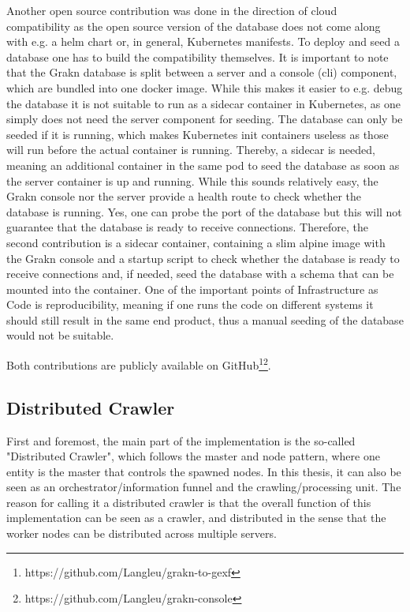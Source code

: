 Another open source contribution was done in the direction of cloud compatibility as the open source version of the database does not come along with e.g. a helm chart or, in general, Kubernetes manifests. To deploy and seed a database one has to build the compatibility themselves. It is important to note that the Grakn database is split between a server and a console (cli) component, which are bundled into one docker image. While this makes it easier to e.g. debug the database it is not suitable to run as a sidecar container in Kubernetes, as one simply does not need the server component for seeding. The database can only be seeded if it is running, which makes Kubernetes init containers useless as those will run before the actual container is running. Thereby, a sidecar is needed, meaning an additional container in the same pod to seed the database as soon as the server container is up and running. While this sounds relatively easy, the Grakn console nor the server provide a health route to check whether the database is running. Yes, one can probe the port of the database but this will not guarantee that the database is ready to receive connections. Therefore, the second contribution is a sidecar container, containing a slim alpine image with the Grakn console and a startup script to check whether the database is ready to receive connections and, if needed, seed the database with a schema that can be mounted into the container.
One of the important points of Infrastructure as Code is reproducibility, meaning if one runs the code on different systems it should still result in the same end product, thus a manual seeding of the database would not be suitable.

Both contributions are publicly available on GitHub\footnote{https://github.com/Langleu/grakn-to-gexf}\footnote{https://github.com/Langleu/grakn-console}.

\subsection{Distributed Crawler}
\label{sec:crawler}
First and foremost, the main part of the implementation is the so-called "Distributed Crawler", which follows the master and node pattern, where one entity is the master that controls the spawned nodes. In this thesis, it can also be seen as an orchestrator/information funnel and the crawling/processing unit. The reason for calling it a distributed crawler is that the overall function of this implementation can be seen as a crawler, and distributed in the sense that the worker nodes can be distributed across multiple servers.

